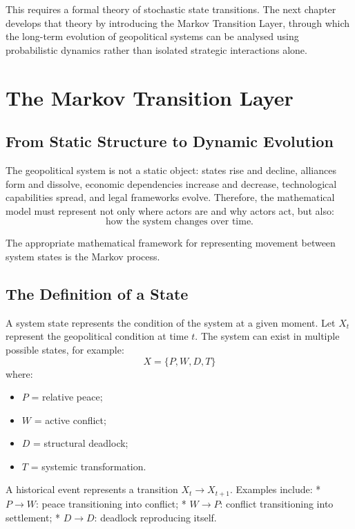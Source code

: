 \documentclass[11pt,openany]{book}
\theoremstyle{plain}
\theoremstyle{definition}
\begin{document}
This requires a formal theory of stochastic state transitions. The next chapter develops that theory by introducing the Markov Transition Layer, through which the long-term evolution of geopolitical systems can be analysed using probabilistic dynamics rather than isolated strategic interactions alone.

\chapter{The Markov Transition Layer}

\section*{From Static Structure to Dynamic Evolution}

The geopolitical system is not a static object: states rise and decline, alliances form and dissolve, economic dependencies increase and decrease, technological capabilities spread, and legal frameworks evolve. Therefore, the mathematical model must represent not only where actors are and why actors act, but also:
\[
\boxed{
\text{how the system changes over time.}
}
\]

The appropriate mathematical framework for representing movement between system states is the Markov process.

\section*{The Definition of a State}

A system state represents the condition of the system at a given moment. Let \(X_t\) represent the geopolitical condition at time \(t\). The system can exist in multiple possible states, for example:
\[
X = \{P, W, D, T\}
\]
where:
\begin{itemize}
\item \(P\) = relative peace;
\item \(W\) = active conflict;
\item \(D\) = structural deadlock;
\item \(T\) = systemic transformation.
\end{itemize}

A historical event represents a transition \(X_t \to X_{t+1}\). Examples include:
* \(P \to W\): peace transitioning into conflict;
* \(W \to P\): conflict transitioning into settlement;
* \(D \to D\): deadlock reproducing itself.
\end{document}
